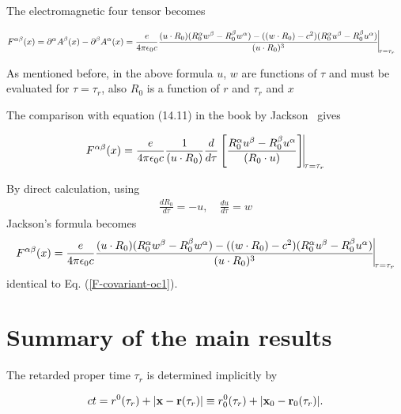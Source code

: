 The electromagnetic four tensor becomes
\begin{importantbox}
    \begin{align}
        F^{\alpha\beta}(x) & =\partial^{\alpha}A^{\beta}(x)-\partial^{\beta}A^{\alpha}(x) ={\frac{e}{4\pi\epsilon_0c}\frac{(u\cdot R_0)(R_0^{\alpha}w^{\beta}-R_0^{\beta}w^{\alpha})-((w\cdot R_0)-c^2)(R_0^{\alpha}u^{\beta}-R_0^{\beta}u^{\alpha})}{(u\cdot R_0)^3}	\vline}_{\tau=\tau_r}
    \end{align}
\end{importantbox}
As mentioned before, in the above formula $u$, $w$ are functions of $\tau$ and must be evaluated for $\tau=\tau_r$, also $R_0$ is a function of $r$ and $\tau_r$ and $x$

The comparison with equation (14.11) in the book by Jackson~\cite{jackson_classical_2009} gives
\begin{importantbox}
    \begin{align}
        F^{\alpha\beta}(x)={\frac{e}{4\pi\epsilon_0c}\frac1{(u\cdot R_0)}\frac{d}{d\tau}\left[\frac{R_0^{\alpha}u^{\beta}-R_0^{\beta}u^{\alpha}}{(R_0\cdot u)}\right]\vline}_{\tau=\tau_r}\label{F-covariant-oc1}
    \end{align}
\end{importantbox}
By direct calculation, using
\begin{align}
    \frac{dR_0}{d\tau}=-u,\quad \frac{du}{d\tau}=w
\end{align}
Jackson's formula becomes
\begin{align}
    F^{\alpha\beta}(x)={\frac{e}{4\pi\epsilon_0c}\frac{(u\cdot R_0)(R_0^{\alpha}w^{\beta}-R_0^{\beta}w^{\alpha})-((w\cdot R_0)-c^2)(R_0^{\alpha}u^{\beta}-R_0^{\beta}u^{\alpha})}{(u\cdot R_0)^3}\vline}_{\tau=\tau_r}
\end{align}
identical to Eq. (\ref{F-covariant-oc1}).


\section{Summary of the main results}

The retarded proper time $\tau_r$ is determined implicitly by
\begin{highlightbox}[title={Retarded proper time}]
    \begin{align}
        ct= r^0(\tau_r)+|{\bf x}-{\bf r}(\tau_r)|
        \equiv r_0^0(\tau_r)+|{\bf x}_0-{\bf r}_0(\tau_r)|.\label{ct-taur-rel}
    \end{align}
\end{highlightbox}

